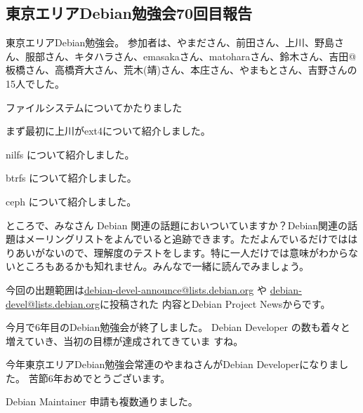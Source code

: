 \documentclass[mingoth,a4paper]{jsarticle}
\begin{document}
\subsection{東京エリアDebian勉強会70回目報告}


東京エリアDebian勉強会。
参加者は、やまださん、前田さん、上川、野島さん、服部さん、キタハラさん、emasakaさん、matoharaさん、鈴木さん、吉田@板橋さん、高橋斉大さん、荒木(靖)さん、本庄さん、やまもとさん、吉野さんの15人でした。

ファイルシステムについてかたりました

まず最初に上川がext4について紹介しました。

nilfs について紹介しました。

btrfs について紹介しました。

ceph について紹介しました。


ところで、みなさん Debian 関連の話題においついていますか？Debian関連の話
題はメーリングリストをよんでいると追跡できます。ただよんでいるだけではは
りあいがないので、理解度のテストをします。特に一人だけでは意味がわからな
いところもあるかも知れません。みんなで一緒に読んでみましょう。

今回の出題範囲は\url{debian-devel-announce@lists.debian.org} や \url{debian-devel@lists.debian.org}に投稿された
内容とDebian Project Newsからです。

\begin{multicols}{2}
 
\end{multicols}



今月で6年目のDebian勉強会が終了しました。
Debian Developer の数も着々と増えていき、当初の目標が達成されてきていま
すね。

今年東京エリアDebian勉強会常連のやまねさんがDebian Developerになりました。
苦節6年おめでとうございます。

Debian Maintainer 申請も複数通りました。
\end{document}
